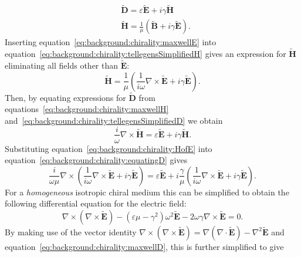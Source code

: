 \begin{align}
    & \mathbf{\tilde D} = \varepsilon \mathbf{\tilde E} + i \gamma \mathbf{\tilde H} \label{eq:background:chirality:tellegensSimplifiedD} \\
    & \mathbf{\tilde H} = \frac{1}{\mu}( \mathbf{\tilde B} + i \gamma \mathbf{\tilde E} ) \label{eq:background:chirality:tellegensSimplifiedH}.
\end{align}
Inserting equation~\ref{eq:background:chirality:maxwellE} into equation~\ref{eq:background:chirality:tellegensSimplifiedH} gives an expression for $\mathbf{\tilde H}$ eliminating all fields other than $\mathbf{\tilde E}$:
\begin{equation}\label{eq:background:chirality:HofE}
    \mathbf{\tilde H} = \frac{1}{\mu} \left( \frac{1}{i \omega} \nabla \times \mathbf{\tilde E} + i \gamma \mathbf{\tilde E} \right).
\end{equation}
Then, by equating expressions for $\mathbf{\tilde D}$ from equations~\ref{eq:background:chirality:maxwellH} and~\ref{eq:background:chirality:tellegensSimplifiedD} we obtain
\begin{equation}\label{eq:background:chirality:equatingD}
    \frac{i}{\omega} \nabla \times \mathbf{\tilde H} = \varepsilon \mathbf{\tilde E} + i \gamma \mathbf{\tilde H}.
\end{equation}
Substituting equation~\ref{eq:background:chirality:HofE} into equation~\ref{eq:background:chirality:equatingD} gives
\begin{equation}\label{eq:background:chirality:diffEfull}
    \frac{i}{\omega \mu} \nabla \times \left( \frac{1}{i \omega} \nabla \times \mathbf{\tilde E} + i \gamma \mathbf{\tilde E} \right) = \varepsilon \mathbf{\tilde E} + i \frac{\gamma}{\mu} \left( \frac{1}{i \omega} \nabla \times \mathbf{\tilde E} + i \gamma \mathbf{\tilde E} \right).
\end{equation}
For a \textit{homogeneous} isotropic chiral medium this can be simplified to obtain the following differential equation for the electric field:
\begin{equation}\label{eq:background:chirality:diffEreduced}
    \nabla \times (\nabla \times \mathbf{\tilde E}) - (\varepsilon \mu - \gamma^2)\omega^2 \mathbf{\tilde E} - 2 \omega \gamma \nabla \times \mathbf{\tilde E} = 0.
\end{equation}
By making use of the vector identity $\nabla \times (\nabla \times \mathbf{\tilde E}) = \nabla(\nabla \cdot \mathbf{\tilde E}) - \nabla^2 \mathbf{\tilde E}$ and equation~\ref{eq:background:chirality:maxwellD}, this is further simplified to give
